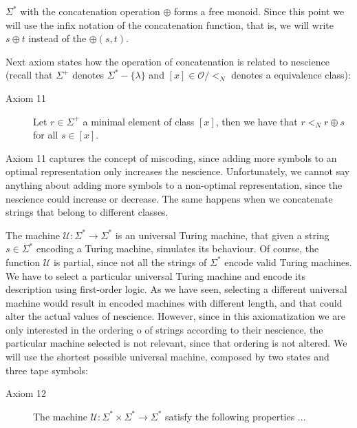 \vskip 0.25cm

$\Sigma^\ast$ with the concatenation operation $\oplus$ forms a free monoid. Since this point we will use the infix notation of the concatenation function, that is, we will write $s \oplus t$ instead of the $\oplus(s, t)$.

Next axiom states how the operation of concatenation is related to nescience (recall that $\Sigma^{+}$ denotes $\Sigma^\ast-\{\lambda\}$ and $[x] \in \mathcal{O} / <_N$ denotes a equivalence class):

\vskip 0.25cm

\begin{description}
\item[Axiom 11] Let $r \in \Sigma^{+}$ a minimal element of class $[x]$, then we have that $r <_N r \oplus s$ for all $s \in [x]$.
\end{description}

\vskip 0.25cm

Axiom 11 captures the concept of miscoding, since adding more symbols to an optimal representation only increases the nescience. Unfortunately, we cannot say anything about adding more symbols to a non-optimal representation, since the nescience could increase or decrease. The same happens when we concatenate strings that belong to different classes. 

The machine $\mathcal{U} : \Sigma^\ast \rightarrow \Sigma^\ast$ is an universal Turing machine, that given a string $s \in \Sigma^\ast$ encoding a Turing machine, simulates its behaviour. Of course, the function $\mathcal{U}$ is partial, since not all the strings of $\Sigma^\ast$ encode valid Turing machines. We have to select a particular universal Turing machine and encode its description using first-order logic. As we have seen, selecting a different universal machine would result in encoded machines with different length, and that could alter the actual values of nescience. However, since in this axiomatization we are only interested in the ordering o of strings according to their nescience, the particular machine selected is not relevant, since that ordering is not altered. We will use the shortest possible universal machine, composed by two states and three tape symbols:

\vskip 0.25cm

\begin{description}
\item[Axiom 12] The machine $\mathcal{U} : \Sigma^\ast \times \Sigma^\ast \rightarrow \Sigma^\ast$ satisfy the following properties ...
\end{description}

